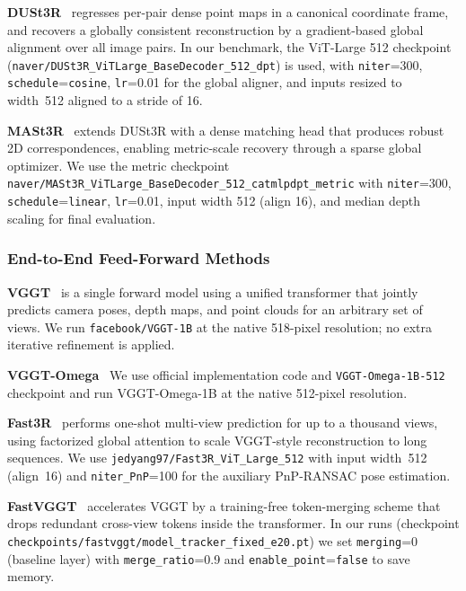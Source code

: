 \documentclass{llmxive}
\begin{document}
\textbf{DUSt3R}~\citep{wang2024dust3r} regresses per-pair dense point maps in a canonical coordinate frame, and recovers a globally consistent reconstruction by a gradient-based global alignment over all image pairs.
%
In our benchmark, the ViT-Large 512 checkpoint (\texttt{naver/DUSt3R\_ViTLarge\_BaseDecoder\_512\_dpt}) is used, with \texttt{niter}=300, \texttt{schedule}=\texttt{cosine}, \texttt{lr}=0.01 for the global aligner, and inputs resized to width~512 aligned to a stride of 16.

\textbf{MASt3R}~\citep{leroy2024mast3r} extends DUSt3R with a dense matching head that produces robust 2D correspondences, enabling metric-scale recovery through a sparse global optimizer. We use the metric checkpoint \texttt{naver/MASt3R\_ViTLarge\_BaseDecoder\_512\_catmlpdpt\_metric} with \texttt{niter}=300, \texttt{schedule}=\texttt{linear}, \texttt{lr}=0.01, input width 512 (align 16), and median depth scaling for final evaluation.

\subsubsection{End-to-End Feed-Forward Methods}

\textbf{VGGT}~\citep{wang2025vggt} is a single forward model using a unified transformer that jointly predicts camera poses, depth maps, and point clouds for an arbitrary set of views.
%
We run \texttt{facebook/VGGT-1B} at the native 518-pixel resolution; no extra iterative refinement is applied.

\textbf{VGGT-Omega}~\citep{wang2026vggtomega} We use official implementation code and \texttt{VGGT-Omega-1B-512} checkpoint and run VGGT-Omega-1B at the native 512-pixel resolution. 

\textbf{Fast3R}~\citep{yang2025fast3r} performs one-shot multi-view prediction for up to a thousand views, using factorized global attention to scale VGGT-style reconstruction to long sequences.
%
We use \texttt{jedyang97/Fast3R\_ViT\_Large\_512} with input width~512 (align~16) and \texttt{niter\_PnP}=100 for the auxiliary PnP-RANSAC pose estimation.

\textbf{FastVGGT}~\citep{shen2025fastvggt} accelerates VGGT by a training-free token-merging scheme that drops redundant cross-view tokens inside the transformer.
%
In our runs (checkpoint \texttt{checkpoints/fastvggt/model\_tracker\_fixed\_e20.pt}) we set \texttt{merging}=0 (baseline layer) with \texttt{merge\_ratio}=0.9 and \texttt{enable\_point}=\texttt{false} to save memory.
\end{document}
